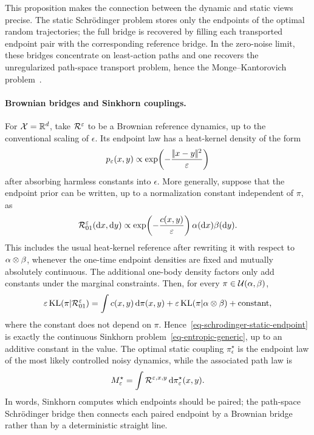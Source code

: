 This proposition makes the connection between the dynamic and static views precise. The static Schr\"odinger problem stores only the endpoints of the optimal random trajectories; the full bridge is recovered by filling each transported endpoint pair with the corresponding reference bridge. In the zero-noise limit, these bridges concentrate on least-action paths and one recovers the unregularized path-space transport problem, hence the Monge--Kantorovich problem~\cite{leonard2012schrodinger}.

\paragraph{Brownian bridges and Sinkhorn couplings.}

For $\mathcal{X}=\mathbb{R}^d$, take $\mathcal{R}^\varepsilon$ to be a Brownian reference dynamics, up to the conventional scaling of $\epsilon$. Its endpoint law has a heat-kernel density of the form
\[
	p_\varepsilon(x,y)\propto \exp\!\left(-\frac{|\!| x-y |\!|^2}{\varepsilon}\right)
\]
after absorbing harmless constants into $\epsilon$. More generally, suppose that the endpoint prior can be written, up to a normalization constant independent of $\pi$, as
\[
	\mathcal{R}^\varepsilon_{01}(\mathrm{d} x,\mathrm{d} y)
	\propto
	\exp\!\left(-\frac{c(x,y)}{\varepsilon}\right)
	\alpha(\mathrm{d} x)\beta(\mathrm{d} y).
\]
This includes the usual heat-kernel reference after rewriting it with respect to $\alpha\otimes\beta$, whenever the one-time endpoint densities are fixed and mutually absolutely continuous. The additional one-body density factors only add constants under the marginal constraints.
Then, for every $\pi\in\mathcal{U}(\alpha,\beta)$,
\[
	\varepsilon\operatorname{KL}(\pi|\mathcal{R}^\varepsilon_{01})
	=
	\int c(x,y)\,\mathrm{d}\pi(x,y)
	+
	\varepsilon\operatorname{KL}(\pi|\alpha\otimes\beta)
	+
	\mathrm{constant},
\]
where the constant does not depend on $\pi$. Hence~\eqref{eq-schrodinger-static-endpoint} is exactly the continuous Sinkhorn problem~\eqref{eq-entropic-generic}, up to an additive constant in the value. The optimal static coupling $\pi_\epsilon^\star$ is the endpoint law of the most likely controlled noisy dynamics, while the associated path law is
\[
	M_\varepsilon^\star
	=
	\int \mathcal{R}^{\varepsilon,x,y}\,\mathrm{d}\pi_\varepsilon^\star(x,y).
\]
In words, Sinkhorn computes which endpoints should be paired; the path-space Schr\"odinger bridge then connects each paired endpoint by a Brownian bridge rather than by a deterministic straight line.

